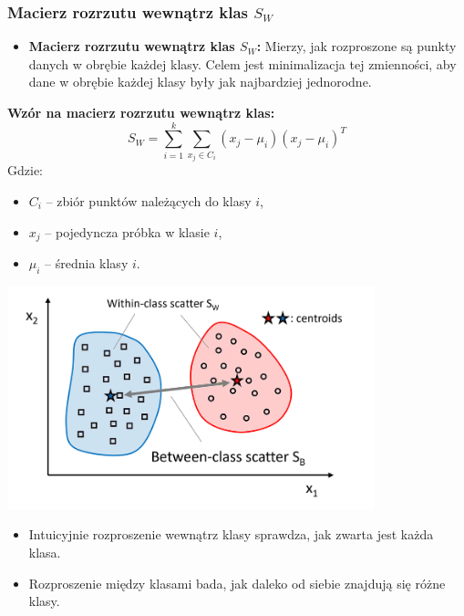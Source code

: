 \documentclass{beamer}
\begin{document}
\begin{frame}
    \frametitle{Macierz rozrzutu wewnątrz klas \( S_W \)}

    \begin{itemize}
        \item \textbf{Macierz rozrzutu wewnątrz klas \( S_W \):}  
        Mierzy, jak rozproszone są punkty danych w obrębie każdej klasy. Celem jest minimalizacja tej zmienności, aby dane w obrębie każdej klasy były jak najbardziej jednorodne.
    \end{itemize}

    \bigskip
    \textbf{Wzór na macierz rozrzutu wewnątrz klas:}
    \[
    S_W = \sum_{i=1}^{k} \sum_{x_j \in C_i} (x_j - \mu_i)(x_j - \mu_i)^T
    \]
    Gdzie:
    \begin{itemize}
        \item \( C_i \) – zbiór punktów należących do klasy \( i \),
        \item \( x_j \) – pojedyncza próbka w klasie \( i \),
        \item \( \mu_i \) – średnia klasy \( i \).
    \end{itemize}
\end{frame}



\begin{frame}
    \includegraphics[width=0.8\textwidth]{rys.png}
    
    \bigskip
    \begin{itemize}
        \item Intuicyjnie rozproszenie wewnątrz klasy sprawdza, jak zwarta jest każda klasa.
        \item Rozproszenie między klasami bada, jak daleko od siebie znajdują się różne klasy.
    \end{itemize}
\end{frame}
\end{document}

